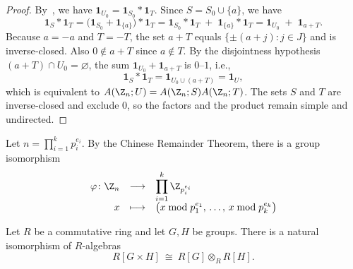 \documentclass{file}
\begin{document}
\begin{proof}
By~, we have $\mathbf 1_{U_0}=\mathbf 1_{S_0}*\mathbf 1_T$.
Since $S=S_0\cup\{a\}$, we have
\[
\mathbf 1_S*\mathbf 1_T
=\bigl(\mathbf 1_{S_0}+\mathbf 1_{\{a\}}\bigr)*\mathbf 1_T
= \mathbf 1_{S_0}*\mathbf 1_T \;+\; \mathbf 1_{\{a\}}*\mathbf 1_T
= \mathbf 1_{U_0} \;+\; \mathbf 1_{a+T}.
\]
Because $a=-a$ and $T=-T$, the set $a+T$ equals $\{\pm(a+j): j\in J\}$ and is inverse‑closed.
Also $0\notin a+T$ since $a\notin T$. By the disjointness hypothesis $(a+T)\cap U_0=\varnothing$,
the sum $\mathbf 1_{U_0}+\mathbf 1_{a+T}$ is $0$–$1$, i.e.,
\[
\mathbf 1_S*\mathbf 1_T=\mathbf 1_{U_0\cup(a+T)}=\mathbf 1_U,
\]
which is equivalent to $A(\Z_n;U)=A(\Z_n;S)A(\Z_n;T)$. The sets $S$ and $T$ are inverse‑closed and exclude $0$,
so the factors and the product remain simple and undirected.
\end{proof}
\begin{nota}
Let $n=\prod_{i=1}^{k} p_i^{e_i}$. By the Chinese Remainder Theorem, there is a group isomorphism
\[
\begin{array}{rcl}
\varphi \colon \Z_n &\longrightarrow& \displaystyle\prod_{i=1}^{k} \Z_{p_i^{e_i}} \\[4pt]
x &\longmapsto& \bigl(x \bmod p_1^{e_1},\, \dots,\, x \bmod p_k^{e_k}\bigr)
\end{array}
\]

\end{nota}

\begin{lem}{\rm \cite{MR2215618}}\label{lem:prod_group_ring}
Let $R$ be a commutative ring and let $G,H$ be groups. There is a natural
isomorphism of $R$-algebras
\[
R[G\times H]\ \cong\ R[G]\otimes_{R} R[H].
\]
\end{lem}

\end{document}
